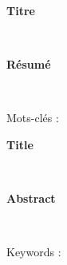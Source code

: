 
\clearpage
{}


\vspace{4cm}

\begin{center}
\begin{large}\textbf{Titre}\end{large}\\
\end{center}
\vspace{1cm}

\begin{center}
\begin{large}\textbf{Résumé}\end{large}\\
\end{center}
\vspace{1cm}


Mots-clés : 


\vspace{2.5cm}
\ligne
\vspace{2.5cm}

\begin{center}
\begin{large}\textbf{Title}\end{large}\\
\end{center}
\vspace{1cm}



\vspace{1cm}
\begin{center}
\begin{large}\textbf{Abstract}\end{large}\\
\end{center}
\vspace{1cm}


Keywords : 
